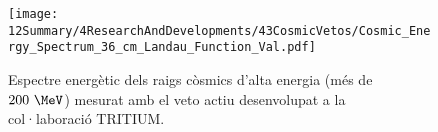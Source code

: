 \begin{itemize}
\begin{figure}[h]
\texttt{[image: 12Summary/4ResearchAndDevelopments/43CosmicVetos/Cosmic\_Energy\_Spectrum\_36\_cm\_Landau\_Function\_Val.pdf]}
\centering
\caption{Espectre energètic dels raigs còsmics d'alta energia (més de $200~\MeV$) mesurat amb el veto actiu desenvolupat a la col·laboració TRITIUM\label{fig:EspectreEnergeticVetoActiu}.}
\end{figure}

\end{itemize} 